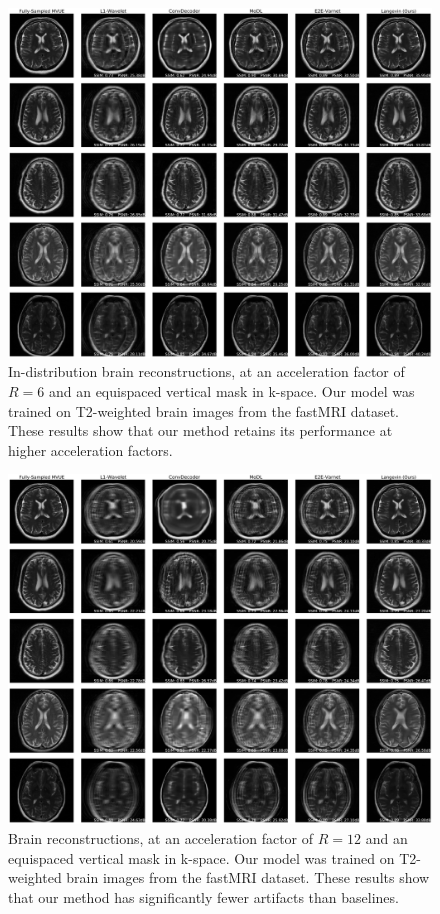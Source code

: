 \begin{figure}
    \centering
    \includegraphics[width=\columnwidth]{brain-equispaced-vertical-R=6-comp.pdf}
    \caption{ In-distribution brain reconstructions, at an acceleration factor of $R=6$ and an equispaced vertical mask in k-space. Our model was trained on T2-weighted brain images from the fastMRI dataset. These results show that our method retains its performance at higher acceleration factors.}
    \label{fig:brain-in-6}
\end{figure}

\begin{figure}
    \centering
    \includegraphics[width=\columnwidth]{brain-equispaced-vertical-R=12-comp.pdf}
    \caption{Brain reconstructions, at an acceleration factor of $R=12$ and an equispaced vertical mask in k-space. Our model was trained on T2-weighted brain images from the fastMRI dataset. These results show that our method has significantly fewer artifacts than baselines.}
    \label{fig:brain-in-12}
\end{figure}

